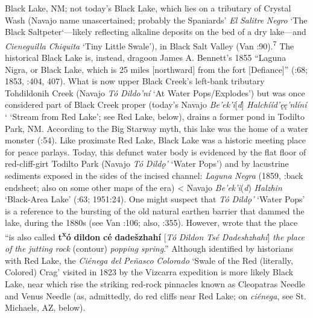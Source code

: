 Black Lake, NM; not today’s Black Lake, which lies on a tributary of Crystal Wash (Navajo name unascertained; probably the Spaniards’ \textit{El} \textit{Salitre} \textit{Negro} ‘The Black Saltpeter‘—likely reflecting alkaline deposits on the bed of a dry lake—and \textit{Cieneguilla} \textit{Chiquita} ‘Tiny Little Swale’), in Black Salt Valley (Van \citealt{ValkenburghWalker1945}:90).\textsuperscript{7}  The historical Black Lake is, instead, dragoon James A. Bennett’s 1855 “Laguna Nigra, or Black Lake, which is 25 miles [northward] from the fort [Defiance]” (\citealt{BrooksReeve1948}:68; 1853, \citealt{Correll1979}:404, 407).  What is now upper Black Creek’s left-bank tributary Tohdildonih Creek (Navajo \textit{Tó} \textit{Dildo’ní} ‘At Water Pops/Explodes’) but was once considered part of Black Creek proper (today’s Navajo \textit{Be’ek’i}[\textit{d}] \textit{Halchííd’ęę’nlíní} ‘ ‘Stream from Red Lake’; see Red Lake, below), drains a former pond in Todilto Park, NM.  According to the Big Starway myth, this lake was the home of a water monster (\citealt{WheelwrightMcAllister1988}:54).  Like proximate Red Lake, Black Lake was a historic meeting place for peace parlays.  Today, this defunct water body is evidenced by the flat floor of red-cliff-girt Todilto Park (Navajo \textit{Tó} \textit{Dildǫ’} ‘Water Pops’) and by lacustrine sediments exposed in the sides of the incised channel:  \textit{Laguna} \textit{Negra} (1859, \citealt{Bailey1964a}:back endsheet; also on some other maps of the era) < Navajo \textit{Be’ek’i}(\textit{d}) \textit{Halzhin} ‘Black-Area Lake’ (\citealt{Haile1950}:63; 1951:24).  One might suspect that \textit{Tó} \textit{Dildǫ’} ‘Water Pops’ is a reference to the bursting of the old natural earthen barrier that dammed the lake, during the 1880s (see Van \citealt{Valkenburgh1999}:106; also, \citealt{Julyan1998}:355).  However, \citet[110]{Haile1950} wrote that the place “is also called \textbf{t\textsuperscript{x}}\textbf{ó} \textbf{dildon} \textbf{cé} \textbf{dadešzhahí} [\textit{Tó} \textit{Dildon} \textit{Tsé} \textit{Dadeshzhahí}] \textit{the} \textit{place} \textit{of} \textit{the} \textit{jutting} \textit{rock} (contour) \textit{popping} \textit{spring}.”  Although identified by historians with Red Lake, the \textit{Ciénega} \textit{del} \textit{Peñasco} \textit{Colorado} ‘Swale of the Red (literally, Colored) Crag’ visited in 1823 by the Vizcarra expedition \citep[136]{Acrey1988} is more likely Black Lake, near which rise the striking red-rock pinnacles known as Cleopatras Needle and Venus Needle (as, admittedly, do red cliffs near Red Lake; on \textit{ciénega}, see St. Michaels, AZ, below).

